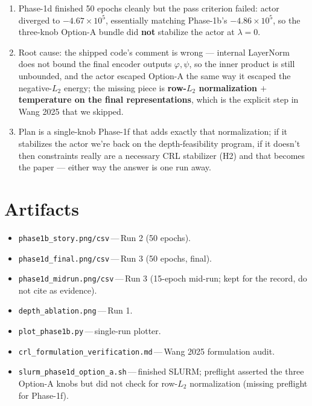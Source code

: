\documentclass[11pt]{article}
\begin{document}
\begin{enumerate}[leftmargin=1.6em,itemsep=3pt,topsep=1pt]
\item Phase-1d finished 50 epochs cleanly but the pass criterion failed:
actor diverged to $-4.67\times 10^{5}$, essentially matching Phase-1b's
$-4.86\times 10^{5}$, so the three-knob Option-A bundle did \textbf{not}
stabilize the actor at $\lambda=0$.
\item Root cause: the shipped code's comment is wrong --- internal LayerNorm
does not bound the final encoder outputs $\varphi,\psi$, so the inner
product is still unbounded, and the actor escaped Option-A the same way
it escaped the negative-$L_2$ energy; the missing piece is
\textbf{row-$L_2$ normalization $+$ temperature on the final
representations}, which is the explicit step in Wang 2025 that we skipped.
\item Plan is a single-knob Phase-1f that adds exactly that normalization;
if it stabilizes the actor we're back on the depth-feasibility program,
if it doesn't then constraints really are a necessary CRL stabilizer
(H2) and that becomes the paper --- either way the answer is one run
away.
\end{enumerate}

\section*{Artifacts}

\begin{itemize}[leftmargin=1.4em,itemsep=1pt,topsep=1pt]
\item \texttt{phase1b\_story.png/csv}\,---\,Run 2 (50 epochs).
\item \texttt{phase1d\_final.png/csv}\,---\,Run 3 (50 epochs, final).
\item \texttt{phase1d\_midrun.png/csv}\,---\,Run 3 (15-epoch mid-run;
kept for the record, do not cite as evidence).
\item \texttt{depth\_ablation.png}\,---\,Run 1.
\item \texttt{plot\_phase1b.py}\,---\,single-run plotter.
\item \texttt{crl\_formulation\_verification.md}\,---\,Wang 2025 formulation
audit.
\item \texttt{slurm\_phase1d\_option\_a.sh}\,---\,finished SLURM; preflight
asserted the three Option-A knobs but did not check for row-$L_2$
normalization (missing preflight for Phase-1f).
\end{itemize}
\end{document}
